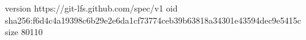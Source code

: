 version https://git-lfs.github.com/spec/v1
oid sha256:f6d4c4a19398c6b29e2e6da1cf73774ceb39b63818a34301e43594dec9e5415c
size 80110

